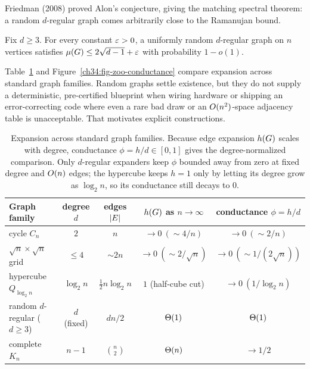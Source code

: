 Friedman (2008) proved Alon's conjecture, giving the matching spectral theorem: a random $d$-regular graph comes arbitrarily close to the Ramanujan bound.

\begin{theorem}
\label{ch34:thm-friedman}
Fix $d\ge 3$. For every constant $\varepsilon>0$, a uniformly random $d$-regular graph on $n$ vertices satisfies $\mu(G)\le 2\sqrt{d-1}+\varepsilon$ with probability $1-o(1)$.
\end{theorem}

Table~\ref{ch34:tab-zoo} and Figure~\ref{ch34:fig-zoo-conductance} compare expansion across standard graph families. Random graphs settle existence, but they do not supply a deterministic, pre-certified blueprint when wiring hardware or shipping an error-correcting code where even a rare bad draw or an $O(n^2)$-space adjacency table is unacceptable. That motivates explicit constructions.

\begin{table}[htbp]
\centering
\begin{tabular}{lcccc}
\toprule
Graph family & degree $d$ & edges $\lvert E\rvert$ & $h(G)$ as $n\to\infty$ & conductance $\phi=h/d$ \\
\midrule
cycle $C_n$        & $2$ & $n$        & $\to 0\ (\sim 4/n)$ & $\to 0\ (\sim 2/n)$ \\
$\sqrt{n}\times\sqrt{n}$ grid & $\le 4$ & $\sim 2n$ & $\to 0\ (\sim 2/\sqrt{n})$ & $\to 0\ (\sim 1/(2\sqrt{n}))$ \\
hypercube $Q_{\log_2 n}$ & $\log_2 n$ & $\frac{1}{2}n\log_2 n$ & $1$ (half-cube cut) & $\to 0\ (1/\log_2 n)$ \\
random $d$-regular ($d\ge 3$) & $d$ (fixed) & $dn/2$ & $\Theta(1)$ & $\Theta(1)$ \\
complete $K_n$     & $n-1$ & $\binom{n}{2}$ & $\Theta(n)$ & $\to 1/2$ \\
\bottomrule
\end{tabular}
\caption{Expansion across standard graph families. Because edge expansion $h(G)$ scales with degree, conductance $\phi=h/d\in[0,1]$ gives the degree-normalized comparison. Only $d$-regular expanders keep $\phi$ bounded away from zero at fixed degree and $O(n)$ edges; the hypercube keeps $h=1$ only by letting its degree grow as $\log_2 n$, so its conductance still decays to $0$.}
\label{ch34:tab-zoo}
\end{table}

